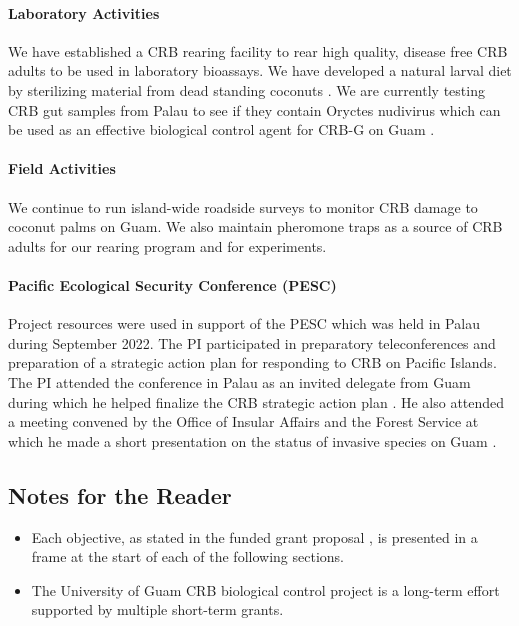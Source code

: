 \documentclass[12pt,letterpaper,english,bibliography=totocnumbered, abstract=on]{scrartcl}
\begin{document}
\paragraph{Laboratory Activities}
	We have established a CRB rearing facility to rear high quality, disease free CRB adults to be used in laboratory bioassays. We have developed a natural larval diet by sterilizing material from dead standing coconuts \cite{Moore_Caser_Cayanan_Mesubed_2023}. We are currently testing CRB gut samples from Palau to see if they contain Oryctes nudivirus which can be used as an effective biological control agent for CRB-G on Guam \cite{Moore_Caser_2023}.
	
\paragraph{Field Activities}	
	We continue to run island-wide roadside surveys to monitor CRB damage to coconut palms on Guam. We also maintain pheromone traps as a source of CRB adults for our rearing program and for experiments.
	
\paragraph{Pacific Ecological Security Conference (PESC)}	
	 Project resources were used in support of the PESC which was held in Palau during September 2022. The PI participated in preparatory teleconferences and preparation of a strategic action plan for responding to CRB on Pacific Islands. The PI attended the conference in Palau as an invited delegate from Guam during which he helped finalize the CRB strategic action plan \cite{anonymousCoconutRhinocerosBeetle2022}. He also attended a meeting convened by the Office of Insular Affairs and the Forest Service at which he made a short presentation on the status of invasive species on Guam \cite{mooreOverviewInvasiveSpecies2022}.

\newpage

\subsection*{Notes for the Reader}

\begin{itemize}

\item Each objective, as stated in the funded grant proposal \cite{mooreGrantProposalDOIOIA2020}, is presented in a frame at the start of each of the following sections. 

\item The University of Guam CRB biological control project is a long-term effort supported by multiple short-term grants.  

\end{itemize}
\end{document}

